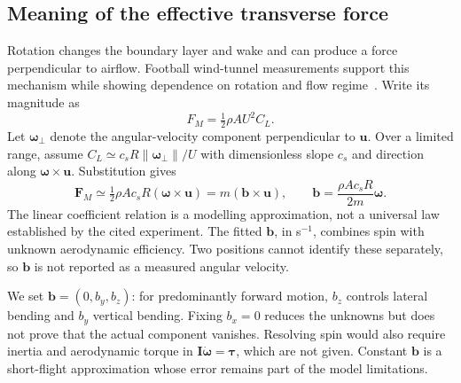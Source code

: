 \documentclass[11pt,a4paper]{article}
\begin{document}
\subsection{Meaning of the effective transverse force}
Rotation changes the boundary layer and wake and can produce a force perpendicular to airflow. Football wind-tunnel measurements support this mechanism while showing dependence on rotation and flow regime~\cite{asai}. Write its magnitude as
\begin{equation}
F_M=\tfrac12\rho AU^2C_L.
\end{equation}
Let $\boldsymbol\omega_\perp$ denote the angular-velocity component perpendicular to $\mathbf u$. Over a limited range, assume $C_L\simeq c_sR\|\boldsymbol\omega_\perp\|/U$ with dimensionless slope $c_s$ and direction along $\boldsymbol\omega\times\mathbf u$. Substitution gives
\begin{equation}
\mathbf F_M\simeq\tfrac12\rho Ac_sR(\boldsymbol\omega\times\mathbf u)
=m(\mathbf b\times\mathbf u),\qquad
\mathbf b=\frac{\rho Ac_sR}{2m}\boldsymbol\omega.
\label{eq:magnus}
\end{equation}
The linear coefficient relation is a modelling approximation, not a universal law established by the cited experiment. The fitted $\mathbf b$, in s$^{-1}$, combines spin with unknown aerodynamic efficiency. Two positions cannot identify these separately, so $\mathbf b$ is not reported as a measured angular velocity.

We set $\mathbf b=(0,b_y,b_z)$: for predominantly forward motion, $b_z$ controls lateral bending and $b_y$ vertical bending. Fixing $b_x=0$ reduces the unknowns but does not prove that the actual component vanishes. Resolving spin would also require inertia and aerodynamic torque in $\mathbf I\dot{\boldsymbol\omega}=\boldsymbol\tau$, which are not given. Constant $\mathbf b$ is a short-flight approximation whose error remains part of the model limitations.
\end{document}
